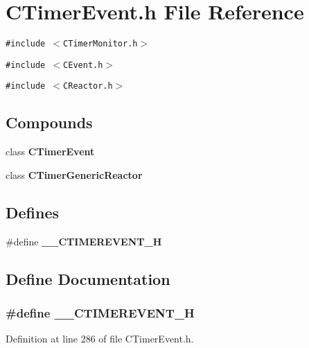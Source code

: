 \section{CTimer\-Event.h File Reference}
\label{CTimerEvent_8h}
{\tt \#include $<$CTimer\-Monitor.h$>$}\par
{\tt \#include $<$CEvent.h$>$}\par
{\tt \#include $<$CReactor.h$>$}\par
\subsection*{Compounds}
\begin{CompactItemize}
\item 
class {\bf CTimer\-Event}
\item 
class {\bf CTimer\-Generic\-Reactor}
\end{CompactItemize}
\subsection*{Defines}
\begin{CompactItemize}
\item 
\#define {\bf \_\-\_\-CTIMEREVENT\_\-H}
\end{CompactItemize}


\subsection{Define Documentation}
\subsubsection{\setlength{\rightskip}{0pt plus 5cm}\#define \_\-\_\-CTIMEREVENT\_\-H}\label{CTimerEvent_8h_a0}




Definition at line 286 of file CTimer\-Event.h.